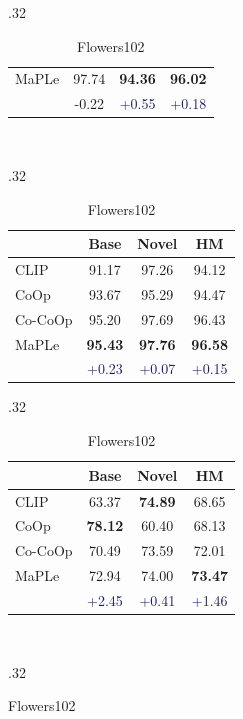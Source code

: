 \documentclass[10pt,twocolumn,letterpaper]{article}
\begin{document}
\begin{table}[t!]
\begin{subtable}[t]{.32\textwidth}
\begin{tabular}{l cc|c}
    \midrule
    \rowcolor{tabhighlight}
    MaPLe & 97.74 & \textbf{94.36} & \textbf{96.02} \\
      &  \textcolor{Bittersweet}{{-0.22}} &  \textcolor{MidnightBlue}{{+0.55}} &  \textcolor{MidnightBlue}{{+0.18}} \\
    \bottomrule
    \end{tabular}
    \end{subtable}
    ~
    \begin{subtable}[t]{.32\textwidth}
    \centering
    \caption{OxfordPets}
    \begin{tabular}{l cc|c}
    \toprule
    & Base & Novel & HM \\
    \midrule
    CLIP & 91.17 & 97.26 & 94.12 \\
    CoOp & 93.67 & 95.29 & 94.47 \\
    Co-CoOp & {95.20} & {97.69} & {96.43} \\
    \midrule
        \rowcolor{tabhighlight}
    MaPLe & \textbf{95.43} & \textbf{97.76} & \textbf{96.58} \\
     &  \textcolor{MidnightBlue}{{+0.23}} &  \textcolor{MidnightBlue}{{+0.07}} &  \textcolor{MidnightBlue}{{+0.15}} \\
    \bottomrule
    \end{tabular}
    \end{subtable}
    \vspace{1em}
    \begin{subtable}[t]{.32\textwidth}
    \centering
    \caption{StanfordCars}
    \begin{tabular}{l cc|c}
    \toprule
    & Base & Novel & HM \\
    \midrule
    CLIP & 63.37 & \textbf{74.89} & 68.65 \\
    CoOp & \textbf{78.12} & 60.40 & 68.13 \\
    Co-CoOp & 70.49 & 73.59 & {72.01} \\
    \midrule
        \rowcolor{tabhighlight}
    MaPLe & 72.94 & 74.00 & \textbf{73.47} \\
    &  \textcolor{MidnightBlue}{{+2.45}} &  \textcolor{MidnightBlue}{{+0.41}} &  \textcolor{MidnightBlue}{{+1.46}} \\
    \bottomrule
    \end{tabular}
    \end{subtable}
    ~
    \begin{subtable}[t]{.32\textwidth}
    \centering
    \caption{Flowers102}
    \begin{tabular}{l cc|c}
    \toprule

\end{tabular}
\end{subtable}
\end{table}
\end{document}
